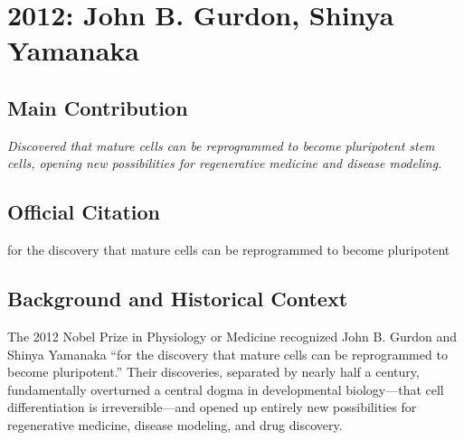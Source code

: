 \chapter[2012 --- Gurdon et al.]{2012: John B. Gurdon, Shinya Yamanaka}
\label{ch:2012_Gurdon}

\section*{Main Contribution}

\textit{Discovered that mature cells can be reprogrammed to become pluripotent stem cells, opening new possibilities for regenerative medicine and disease modeling.}\cite{nobel-2012,lecture-2012}

\section{Official Citation}

for the discovery that mature cells can be reprogrammed to become pluripotent

\section{Background and Historical Context}

The 2012 Nobel Prize in Physiology or Medicine recognized John B. Gurdon and Shinya Yamanaka ``for the discovery that mature cells can be reprogrammed to become pluripotent.'' Their discoveries, separated by nearly half a century, fundamentally overturned a central dogma in developmental biology---that cell differentiation is irreversible---and opened up entirely new possibilities for regenerative medicine, disease modeling, and drug discovery.

